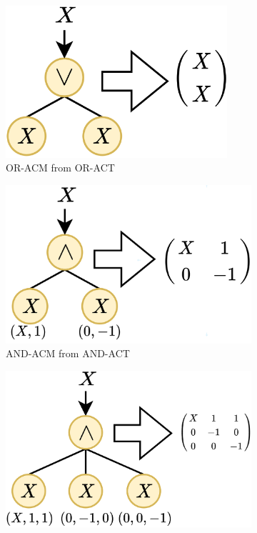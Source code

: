 \begin{figure}[ht]
\vspace{-10pt}
     \centering
     \begin{subfigure}[b]{0.3\textwidth}
         \centering
         \includegraphics[width=0.9\textwidth]{image/lsss/oract.png}
         \caption{OR-ACM from OR-ACT}
         \label{fig:oracm}
     \end{subfigure}
     \hfill
     \begin{subfigure}[b]{0.3\textwidth}
         \centering
         \includegraphics[width=\textwidth]{image/lsss/and2act.png}
         \caption{AND-ACM from AND-ACT}
         \label{fig:and2acm}
     \end{subfigure}
     \hfill
        \begin{subfigure}[b]{0.3\textwidth}
         \centering
         \includegraphics[width=\textwidth]{image/lsss/and3act.png}

\end{subfigure}
\end{figure}
